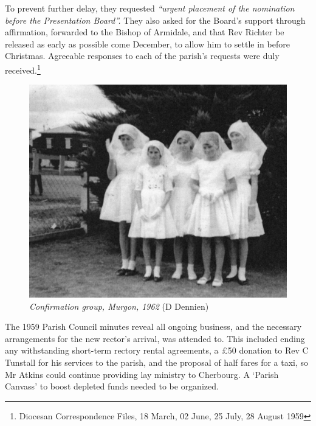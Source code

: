 To prevent further delay, they requested \emph{``urgent placement of the nomination before the Presentation Board''.} They also asked for the Board's support through affirmation, forwarded to the Bishop of Armidale, and that Rev Richter be released as early as possible come December, to allow him to settle in before Christmas. Agreeable responses to each of the parish's requests were duly received.\footnote{Diocesan Correspondence Files, 18 March, 02 June, 25 July, 28 August 1959}








\begin{figure}
\begin{center}
\includegraphics[width=1.\linewidth,center]{../images/confirmation1962.jpg}
\caption{{\itshape Confirmation group, Murgon, 1962} {\scriptsize(D Dennien)}}
\end{center}
\end{figure}




The 1959 Parish Council minutes reveal all ongoing business, and the necessary arrangements for the new rector's arrival, was attended to. This included ending any withstanding short-term rectory rental agreements, a \pounds50 donation to Rev C Tunstall for his services to the parish, and the proposal of half fares for a taxi, so Mr Atkins could continue providing lay ministry to Cherbourg. A `Parish Canvass' to boost depleted funds needed to be organized.



